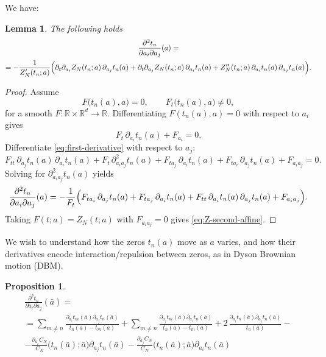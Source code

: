 \documentclass[12pt,reqno]{amsart}
\theoremstyle{plain}
\newtheorem{prop}{Proposition}[section]
\newtheorem{lemma}[theorem]{Lemma}
\theoremstyle{definition}
\theoremstyle{remark}
\begin{document}
We have:
\begin{lemma} \label{lem:6.1} The following holds
\begin{multline}\label{eq:Z-second-affine}
\frac{\partial^2 t_n}{\partial a_i\partial a_j}(a)
=\\=
-\frac{1}{Z_N'(t_n;a)}
\Bigl(
\partial_t\partial_{a_i}Z_N(t_n;a)\,\partial_{a_j}t_n(a)
+\partial_t\partial_{a_j}Z_N(t_n;a)\,\partial_{a_i}t_n(a)
+Z_N''(t_n;a)\,\partial_{a_i}t_n(a)\,\partial_{a_j}t_n(a)
\Bigr).
\end{multline}
\end{lemma}

\begin{proof}
Assume 
\begin{equation}\label{eq:implicit-eq}
F\bigl(t_n(a),a\bigr)=0,
\qquad
F_t\bigl(t_n(a),a\bigr)\neq 0 ,
\end{equation}
for a smooth \(F:\mathbb{R}\times\mathbb{R}^d\to\mathbb{R}\).
Differentiating \(F(t_n(a),a)=0\) with respect to \(a_i\) gives
\begin{equation}\label{eq:first-derivative}
F_t\,\partial_{a_i}t_n(a)+F_{a_i}=0.
\end{equation}
Differentiate \eqref{eq:first-derivative} with respect to \(a_j\):
\begin{equation}
F_{tt}\,\partial_{a_j}t_n(a)\,\partial_{a_i}t_n(a)
+F_t\,\partial^2_{a_i a_j}t_n(a)
+F_{t a_j}\,\partial_{a_i}t_n(a)
+F_{t a_i}\,\partial_{a_j}t_n(a)
+F_{a_i a_j}=0.
\end{equation}
Solving for \(\partial^2_{a_i a_j}t_n(a)\) yields
\begin{equation}\label{eq:IFT-second}
\frac{\partial^2 t_n}{\partial a_i\partial a_j}(a)
=
-\frac{1}{F_t}\Bigl(
F_{t a_i}\,\partial_{a_j}t_n(a)
+F_{t a_j}\,\partial_{a_i}t_n(a)
+F_{t t}\,\partial_{a_i}t_n(a)\,\partial_{a_j}t_n(a)
+F_{a_i a_j}
\Bigr).
\end{equation}
Taking \(F(t;a)=Z_N(t;a)\) with \(F_{a_i a_j}=0\) gives \eqref{eq:Z-second-affine}.
\end{proof}

We wish to understand how the zeros \( t_n(a) \) move as \(a\) varies, and how their derivatives encode interaction/repulsion between zeros, as in Dyson Brownian motion (DBM).
\begin{prop}
\label{prop:hessian-final-prop}
\begin{multline}
\frac{\partial^2 t_n}{\partial a_i\partial a_j}(\bar a)
=\\ =\sum_{m\neq n}\frac{\partial_{a_i}t_m(\bar a) \partial_{a_j} t_n(\bar a)}{t_n(\bar a)-t_m(\bar a)} + \sum_{m\neq n}\frac{\partial_{a_j}t_m(\bar a) \partial_{a_i} t_n(\bar a)}{t_n(\bar a)-t_m(\bar a)}+2 \,\frac{\partial_{a_i}t_n(\bar a)\partial_{a_j}t_n(\bar a)}{t_n(\bar a)}-\\
- \frac{\partial_{a_i} C_N}{ C_N} \!\bigl(t_n(\bar a);\bar a \bigr)\partial_{a_j}t_n(\bar a)- \frac{\partial_{a_j} C_N}{ C_N} \!\bigl(t_n(\bar a);\bar a \bigr)\partial_{a_i}t_n(\bar a)
\end{multline}
\end{prop}
\end{document}

